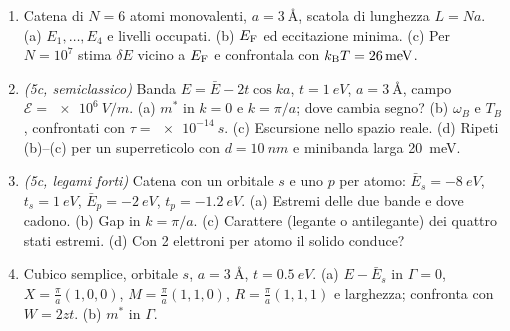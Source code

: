 \documentclass[11pt,a4paper]{article}
\begin{document}
\begin{enumerate}[label=\textbf{E\arabic*.}, leftmargin=2.3em, itemsep=2pt]
\item Catena di $N=6$ atomi monovalenti, $a=\SI{3}{\angstrom}$, scatola di lunghezza $L=Na$. (a) $E_1,\dots,E_4$ e livelli occupati. (b) $E_{\mathrm F}$ ed eccitazione minima. (c) Per $N=10^7$ stima $\delta E$ vicino a $E_{\mathrm F}$ e confrontala con $k_{\mathrm B} T=\SI{26}{meV}$.
\item \emph{(5c, semiclassico)} Banda $E=\bar E-2t\cos ka$, $t=\SI{1}{eV}$, $a=\SI{3}{\angstrom}$, campo $\mathcal E=\SI{e6}{V/m}$. (a) $m^*$ in $k=0$ e $k=\pi/a$; dove cambia segno? (b) $\omega_B$ e $T_B$, confrontati con $\tau=\SI{e-14}{s}$. (c) Escursione nello spazio reale. (d) Ripeti (b)--(c) per un superreticolo con $d=\SI{10}{nm}$ e minibanda larga \SI{20}{meV}.
\item \emph{(5c, legami forti)} Catena con un orbitale $s$ e uno $p$ per atomo: $\bar E_s=\SI{-8}{eV}$, $t_s=\SI{1}{eV}$, $\bar E_p=\SI{-2}{eV}$, $t_p=\SI{-1.2}{eV}$. (a) Estremi delle due bande e dove cadono. (b) Gap in $k=\pi/a$. (c) Carattere (legante o antilegante) dei quattro stati estremi. (d) Con 2 elettroni per atomo il solido conduce?
\item Cubico semplice, orbitale $s$, $a=\SI{3}{\angstrom}$, $t=\SI{0.5}{eV}$. (a) $E-\bar E_s$ in $\Gamma=0$, $X=\frac\pi a(1,0,0)$, $M=\frac\pi a(1,1,0)$, $R=\frac\pi a(1,1,1)$ e larghezza; confronta con $W=2zt$. (b) $m^*$ in $\Gamma$.
\end{enumerate}
\end{document}
